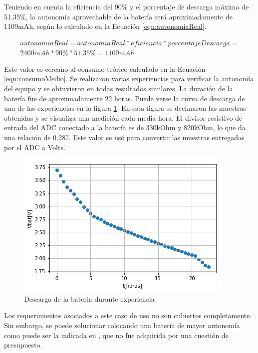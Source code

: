 Teniendo en cuenta la eficiencia del 90\% y el porcentaje de descarga máxima de 51.35\%, la autonomía aprovechable de la batería será aproximadamente de 1109mAh, según lo calculado en la Ecuación \ref{eqn:autonomiaReal}.


\begin{equation} \label{eqn:autonomiaReal}
\begin{split}
autonomiaReal = autonomiaReal*eficiencia*porcentajeDescarga = \\ 2400mAh * 90\% * 51.35\% = 1109 mAh
\end{split}
\end{equation}

Este valor es cercano al consumo teórico calculado en la Ecuación \ref{eqn:consumoMedio}.
Se realizaron varias experiencias para verificar la autonomía del equipo y se obtuvieron en todas resultados similares. La duración de la batería fue de aproximadamente 22 horas. Puede verse la curva de descarga de una de las experiencias en la figura \ref{fig:descargaBateria}. En esta figura se decimaron las muestras obtenidas y se visualiza una medición cada media hora. El divisor resistivo de entrada del ADC conectado a la batería es de 330kOhm y 820kOhm, lo que da una relación de 0.287. Este valor se usó para convertir las muestras entregadas por el ADC a Volts.

\begin{figure} [!htpb]
    \centering
    \includegraphics[width=\textwidth]{./Figures/descargaBateria.png}
    \caption{Descarga de la bateria durante experiencia}
    \label{fig:descargaBateria}
\end{figure}

Los requerimientos asociados a este caso de uso no son cubiertos completamente. Sin embargo, se puede solucionar colocando una batería de mayor autonomía como puede ser la indicada en \citep{rs2019}, que no fue adquirida por una cuestión de presupuesto.


